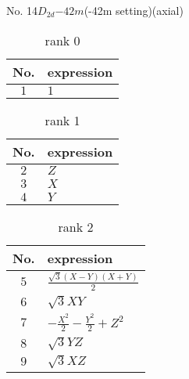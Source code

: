 \documentclass[fleqn,8pt,landscape]{jsarticle}
\begin{document}
\setcounter{MaxMatrixCols}{16}

\begin{center}
\LARGE
No. 14\quad$D_{2d}$\quad$-42m$\quad(-42m setting)\quad[ tetragonal ] (axial)
\end{center}
\begin{table}[ht!]
\begin{center}
\caption{rank 0}
\renewcommand{\arraystretch}{1.3}
\begin{tabular}{cl} \hline \hline
No. & expression \\ \hline
$ 1 $ & $ 1 $ \\
 \hline \hline
\end{tabular}
\end{center}
\end{table}
\begin{table}[ht!]
\begin{center}
\caption{rank 1}
\renewcommand{\arraystretch}{1.3}
\begin{tabular}{cl} \hline \hline
No. & expression \\ \hline
$ 2 $ & $ Z $ \\
$ 3 $ & $ X $ \\
$ 4 $ & $ Y $ \\
 \hline \hline
\end{tabular}
\end{center}
\end{table}
\begin{table}[ht!]
\begin{center}
\caption{rank 2}
\renewcommand{\arraystretch}{1.3}
\begin{tabular}{cl} \hline \hline
No. & expression \\ \hline
$ 5 $ & $ \frac{\sqrt{3} \left(X - Y\right) \left(X + Y\right)}{2} $ \\
$ 6 $ & $ \sqrt{3} X Y $ \\
$ 7 $ & $ - \frac{X^{2}}{2} - \frac{Y^{2}}{2} + Z^{2} $ \\
$ 8 $ & $ \sqrt{3} Y Z $ \\
$ 9 $ & $ \sqrt{3} X Z $ \\
 \hline \hline
\end{tabular}
\end{center}
\end{table}
\end{document}
